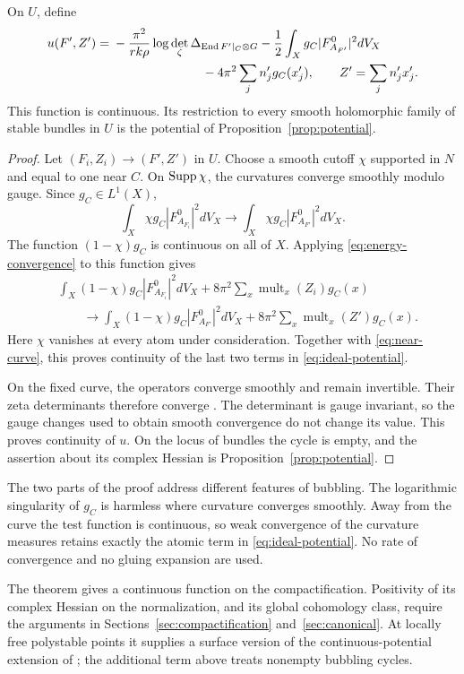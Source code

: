 \begin{theorem}\label{thm:continuous-potential}
On $U$, define
\begin{align}\label{eq:ideal-potential}
 u(F',Z')={}&-\frac{\pi^2}{rk\rho}\log\det_\zeta\Delta_{\End F'|_C\otimes G}
       -\frac12\int_Xg_C|F_{A_{F'}}^0|^2dV_X\notag\\
 &\hspace{25mm}-4\pi^2\sum_jn'_jg_C(x'_j),
 \qquad Z'=\sum_jn'_jx'_j.
\end{align}
This function is continuous. Its restriction to every smooth holomorphic
family of stable bundles in $U$ is the potential of
Proposition~\ref{prop:potential}.
\end{theorem}
\begin{proof}
Let $(F_i,Z_i)\to(F',Z')$ in $U$. Choose a smooth cutoff $\chi$ supported in
$N$ and equal to one near $C$. On $\operatorname{Supp}\chi$, the curvatures converge
smoothly modulo gauge. Since $g_C\in L^1(X)$,
\begin{equation}\label{eq:near-curve}
 \int_X\chi g_C|F_{A_{F_i}}^0|^2dV_X
 \longrightarrow\int_X\chi g_C|F_{A_{F'}}^0|^2dV_X.
\end{equation}
The function $(1-\chi)g_C$ is continuous on all of $X$.
Applying \eqref{eq:energy-convergence} to this function gives
\begin{align*}
 &\int_X(1-\chi)g_C|F_{A_{F_i}}^0|^2dV_X
       +8\pi^2\sum_x\operatorname{mult}_x(Z_i)g_C(x)\\
 &\qquad\longrightarrow
 \int_X(1-\chi)g_C|F_{A_{F'}}^0|^2dV_X
       +8\pi^2\sum_x\operatorname{mult}_x(Z')g_C(x).
\end{align*}
Here $\chi$ vanishes at every atom under consideration.
Together with \eqref{eq:near-curve}, this proves continuity of the last two
terms in \eqref{eq:ideal-potential}.

On the fixed curve, the operators converge smoothly and remain invertible.
Their zeta determinants therefore converge
\cite[Theorem~1.6 and Remark~1.10]{BGS88}.
The determinant is gauge invariant, so the gauge changes used to obtain
smooth convergence do not change its value.
This proves continuity of $u$. On the locus of bundles the cycle is empty,
and the assertion about its complex Hessian is
Proposition~\ref{prop:potential}.
\end{proof}

The two parts of the proof address different features of bubbling.
The logarithmic singularity of $g_C$ is harmless where curvature converges
smoothly. Away from the curve the test function is continuous, so weak
convergence of the curvature measures retains exactly the atomic term in
\eqref{eq:ideal-potential}. No rate of convergence and no gluing expansion
are used.

The theorem gives a continuous function on the compactification. Positivity
of its complex Hessian on the normalization, and its global cohomology
class, require the arguments in Sections~\ref{sec:compactification}
and~\ref{sec:canonical}. At locally free polystable points it supplies a
surface version of the continuous-potential extension of
\cite[Theorem~11]{BSc20}; the additional term above treats nonempty bubbling
cycles.
